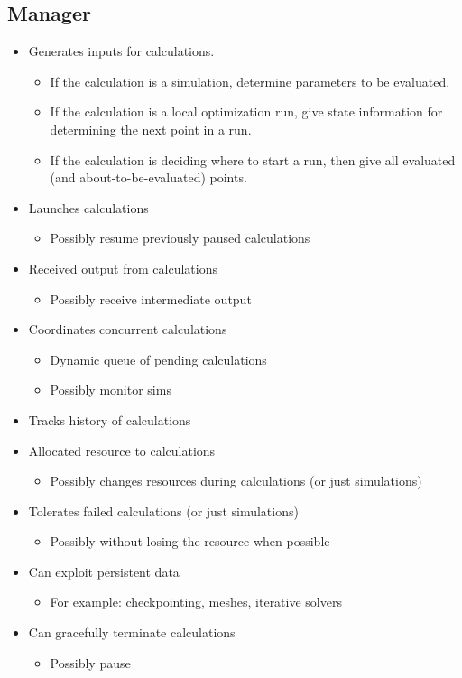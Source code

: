 \documentclass{article}
\begin{document}
\subsection{Manager}
\begin{itemize}
  \item Generates inputs for calculations.
    \begin{itemize}
      \item If the calculation is a simulation, determine parameters to be
        evaluated.
      \item If the calculation is a local optimization run, give state
        information for determining the next point in a run. 
      \item If the calculation is deciding where to start a run, then give all
        evaluated (and about-to-be-evaluated) points.
    \end{itemize}
  \item Launches calculations
    \begin{itemize}
      \item Possibly resume previously paused calculations
    \end{itemize}
  \item Received output from calculations
    \begin{itemize}
      \item Possibly receive intermediate output
    \end{itemize}
  \item Coordinates concurrent calculations 
    \begin{itemize}
      \item Dynamic queue of pending calculations
      \item Possibly monitor sims
    \end{itemize}
  \item Tracks history of calculations
  \item Allocated resource to calculations 
    \begin{itemize}
      \item Possibly changes resources during calculations (or just simulations)
    \end{itemize}
  \item Tolerates failed calculations (or just simulations)
    \begin{itemize}
      \item Possibly without losing the resource when possible
    \end{itemize}
  \item Can exploit persistent data
    \begin{itemize}
      \item For example: checkpointing, meshes, iterative solvers
    \end{itemize}
  \item Can gracefully terminate calculations
    \begin{itemize}
      \item Possibly pause
    \end{itemize}
\end{itemize}
\end{document}
